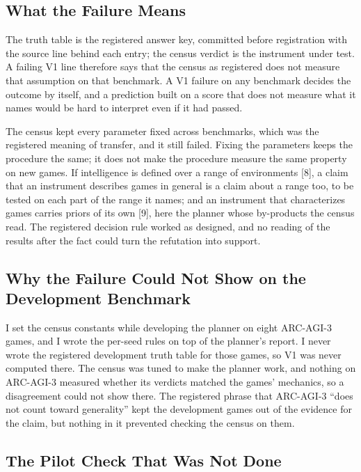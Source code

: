 \documentclass[journal]{IEEEtran}
\begin{document}
\subsection{What the Failure Means}\label{what-the-failure-means}

The truth table is the registered answer key, committed before
registration with the source line behind each entry; the census verdict
is the instrument under test. A failing V1 line therefore says that the
census as registered does not measure that assumption on that benchmark.
A V1 failure on any benchmark decides the outcome by itself, and a
prediction built on a score that does not measure what it names would be
hard to interpret even if it had passed.

The census kept every parameter fixed across benchmarks, which was the
registered meaning of transfer, and it still failed. Fixing the
parameters keeps the procedure the same; it does not make the procedure
measure the same property on new games. If intelligence is defined over
a range of environments {[}8{]}, a claim that an instrument describes
games in general is a claim about a range too, to be tested on each part
of the range it names; and an instrument that characterizes games
carries priors of its own {[}9{]}, here the planner whose by-products
the census read. The registered decision rule worked as designed, and no
reading of the results after the fact could turn the refutation into
support.

\subsection{Why the Failure Could Not Show on the Development
Benchmark}\label{why-the-failure-could-not-show-on-the-development-benchmark}

I set the census constants while developing the planner on eight
ARC-AGI-3 games, and I wrote the per-seed rules on top of the planner's
report. I never wrote the registered development truth table for those
games, so V1 was never computed there. The census was tuned to make the
planner work, and nothing on ARC-AGI-3 measured whether its verdicts
matched the games' mechanics, so a disagreement could not show there.
The registered phrase that ARC-AGI-3 ``does not count toward
generality'' kept the development games out of the evidence for the
claim, but nothing in it prevented checking the census on them.

\subsection{The Pilot Check That Was Not
Done}\label{the-pilot-check-that-was-not-done}
\end{document}
